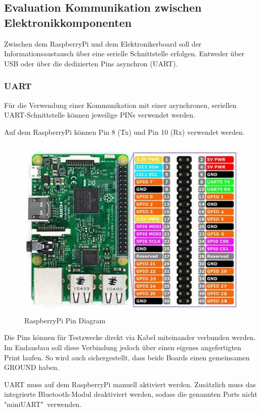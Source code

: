 \documentclass[a4paper]{report}
\begin{document}
\subsection{Evaluation Kommunikation zwischen Elektronikkomponenten}

Zwischen dem RaspberryPi und dem Elektronikerboard soll der Informationsaustausch über eine serielle Schnittstelle erfolgen. Entweder über USB oder über die dedizierten Pins asynchron (UART).

\subsubsection{UART}

Für die Verwendung einer Kommunikation mit einer asynchronen, seriellen UART-Schnittstelle können jeweilige PINs verwendet werden.

Auf dem RaspberryPi können Pin 8 (Tx) und Pin 10 (Rx) verwendet werden.

\begin{figure}
	\includegraphics[keepaspectratio, width=\textwidth]{raspberry_pi3_model_b_pin_diagram.jpg}
	\caption{RaspberryPi Pin Diagram}
	\label{fig:RaspberryPins}
\end{figure}

Die Pins können für Testzwecke direkt via Kabel miteinander verbunden werden. Im Endausbau soll diese Verbindung jedoch über einen eigenes angefertigten Print laufen. So wird auch sichergestellt, dass beide Boards einen gemeinsamen GROUND haben.

UART muss auf dem RaspberryPi manuell aktiviert werden.  Zusätzlich muss das integrierte Bluetooth-Modul deaktiviert werden, sodass die genannten Ports nicht "miniUART"\ verwenden.
\end{document}
